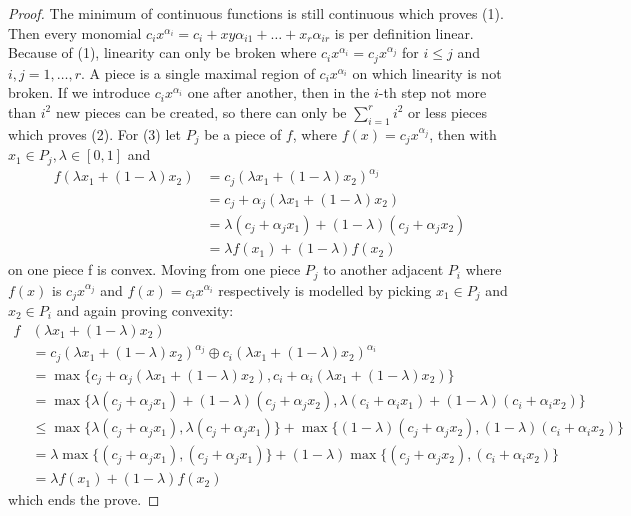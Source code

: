 \documentclass{article}
\theoremstyle{definition}
\begin{document}
\begin{proof}
The minimum of continuous functions is still continuous which proves (1). Then every monomial $c_ix^{\alpha_i} = c_i + xy\alpha_{i1} + \dots + x_r \alpha_{ir}$ is per definition linear. Because of (1), linearity can only be broken where $c_i x^{\alpha_i} = c_j x^{\alpha_j}$ for $i \leq j$ and $i,j = 1, \dots ,r$. A piece is a single maximal region of $c_ix^{\alpha_i}$ on which linearity is not broken. If we introduce $c_ix^{\alpha_i}$ one after another, then in the $i$-th step not more than $i^2$ new pieces can be created, so there can only be $ \sum_{i=1}^{r} i^2$ or less pieces which proves (2). 
For (3) let $P_{j}$ be a piece of $f$, where $f(x)=c_{j}x^{\alpha_{j}}$, then with $x_{1} \in P_{j}, \lambda \in [0,1]$ and
\begin{align*}
f(\lambda x_{1} + (1-\lambda)x_{2})
&= c_{j}(\lambda x_{1} + (1-\lambda)x_{2})^{\alpha_{j}} \\
&= c_{j} + \alpha_{j}(\lambda x_{1} + (1-\lambda)x_{2}) \\
&= \lambda(c_{j}+\alpha_{j}x_{1}) + (1-\lambda)(c_{j}+\alpha_{j}x_{2}) \\
&= \lambda f(x_{1}) + (1-\lambda) f(x_{2})
\end{align*}
on one piece f is convex. Moving from one piece $P_{j}$ to another adjacent $P_{i}$ where $f(x)$ is $c_{j}x^{\alpha_{j}}$ and $f(x)=c_{i}x^{\alpha_{i}}$ respectively is modelled by picking $x_{1} \in P_{j}$ and $x_{2} \in P_{i}$ and again proving convexity:
\begin{align*}
f&(\lambda x_{1} + (1-\lambda)x_{2}) \\
&= c_{j}(\lambda x_{1} + (1-\lambda) x_{2})^{\alpha_{j}} \oplus c_{i}(\lambda x_{1} + (1-\lambda) x_{2})^{\alpha_{i}} \\
&= \max \{ c_{j} + \alpha_{j}(\lambda x_{1} + (1-\lambda) x_{2}), c_{i} + \alpha_{i}(\lambda x_{1} + (1-\lambda) x_{2}) \} \\
&= \max \{ \lambda (c_{j} + \alpha_{j}x_{1}) + (1-\lambda) (c_{j} + \alpha_{j}x_{2}) , \lambda (c_{i} + \alpha_{i}x_{1}) + (1-\lambda) (c_{i} + \alpha_{i}x_{2})\} \\
&\leq \max \{ \lambda (c_{j} + \alpha_{j}x_{1}), \lambda (c_{j} + \alpha_{j}x_{1}) \} + \max \{ (1-\lambda) (c_{j} + \alpha_{j}x_{2}), (1-\lambda) (c_{i} + \alpha_{i}x_{2}) \} \\
&= \lambda \max \{ (c_{j} + \alpha_{j}x_{1}), (c_{j} + \alpha_{j}x_{1}) \} + (1-\lambda) \max \{ (c_{j} + \alpha_{j}x_{2}), (c_{i} + \alpha_{i}x_{2}) \} \\
&= \lambda f(x_{1}) + (1-\lambda) f(x_{2})
\end{align*}
which ends the prove.
\end{proof}
\end{document}
